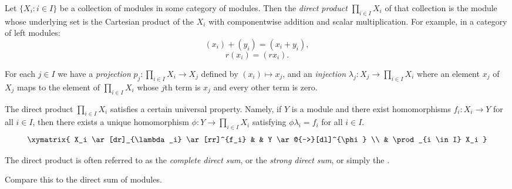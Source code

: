 \documentclass[12pt]{article}
\begin{document}
Let $\{ X_i : i \in I \}$ be a collection of modules
in some category of modules.
Then the {\it direct product} $\prod_{i \in I} X_i$
of that collection is the module
whose underlying set is the Cartesian product of the $X_i$
with componentwise addition and scalar multiplication.
For example, in a category of left modules:
$$(x_i) + (y_i) = (x_i + y_i),$$
$$r (x_i) = (r x_i).$$

For each $j \in I$ we have
a {\it projection} $p_j : \prod_{i \in I} X_i \to X_j$
defined by $(x_i) \mapsto x_j$,
and
an {\it injection} $\lambda_j : X_j \to \prod_{i \in I} X_i$
where an element $x_j$ of $X_j$
maps to the element of $\prod_{i \in I} X_i$
whose $j$th term is $x_j$ and every other term is zero.

The direct product $\prod_{i \in I} X_i$
satisfies a certain universal property.
Namely, if $Y$ is a module
and there exist homomorphisms $f_i : X_i \to Y$
for all $i \in I$,
then there exists a unique homomorphism
$\phi : Y \to \prod_{i \in I} X_i$
satisfying $\phi \lambda_i = f_i$ for all $i \in I$.
$$
\xymatrix{
  X_i
        \ar[dr]_{\lambda_i}
        \ar[rr]^{f_i}
  &
  &
  Y
        \ar@{-->}[dl]^{\phi}
  \\
  &
  \prod_{i \in I} X_i
}
$$

The direct product is often referred to
as the {\it complete direct sum},
or the {\it strong direct sum},
or simply the {}.

Compare this to the direct sum of modules.
\end{document}
